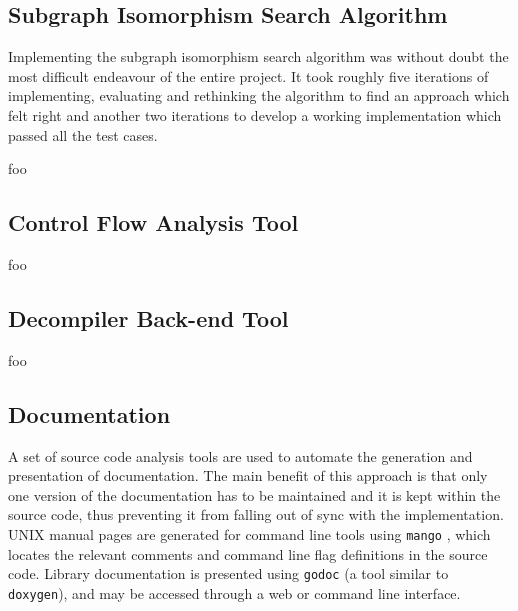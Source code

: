 \subsection{Subgraph Isomorphism Search Algorithm}

Implementing the subgraph isomorphism search algorithm was without doubt the most difficult endeavour of the entire project. It took roughly five iterations of implementing, evaluating and rethinking the algorithm to find an approach which felt right and another two iterations to develop a working implementation which passed all the test cases.

foo



\subsection{Control Flow Analysis Tool}

foo


\subsection{Decompiler Back-end Tool}

foo


\subsection{Documentation}


A set of source code analysis tools are used to automate the generation and presentation of documentation. The main benefit of this approach is that only one version of the documentation has to be maintained and it is kept within the source code, thus preventing it from falling out of sync with the implementation. UNIX manual pages are generated for command line tools using \texttt{mango} \cite{mango}, which locates the relevant comments and command line flag definitions in the source code. Library documentation is presented using \texttt{godoc} \cite{godoc} (a tool similar to \texttt{doxygen}), and may be accessed through a web or command line interface.

